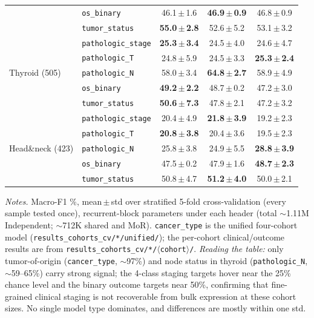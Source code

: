 \documentclass[11pt]{article}
\newcommand{\best}[1]{\textbf{#1}}
\begin{document}
\begin{table}[h]
\begin{tabular}{l l c c c}
 & \texttt{os\_binary}        & 46.1\,$\pm$\,1.6 & \best{46.9\,$\pm$\,0.9} & 46.8\,$\pm$\,0.9 \\
 & \texttt{tumor\_status}     & \best{55.0\,$\pm$\,2.8} & 52.6\,$\pm$\,5.2 & 53.1\,$\pm$\,3.2 \\
\midrule
\multirow{5}{*}{Thyroid (505)}
 & \texttt{pathologic\_stage} & \best{25.3\,$\pm$\,3.4} & 24.5\,$\pm$\,4.0 & 24.6\,$\pm$\,4.7 \\
 & \texttt{pathologic\_T}     & 24.8\,$\pm$\,5.9 & 24.5\,$\pm$\,3.3 & \best{25.3\,$\pm$\,2.4} \\
 & \texttt{pathologic\_N}     & 58.0\,$\pm$\,3.4 & \best{64.8\,$\pm$\,2.7} & 58.9\,$\pm$\,4.9 \\
 & \texttt{os\_binary}        & \best{49.2\,$\pm$\,2.2} & 48.7\,$\pm$\,0.2 & 47.2\,$\pm$\,3.0 \\
 & \texttt{tumor\_status}     & \best{50.6\,$\pm$\,7.3} & 47.8\,$\pm$\,2.1 & 47.2\,$\pm$\,3.2 \\
\midrule
\multirow{5}{*}{Head\&neck (423)}
 & \texttt{pathologic\_stage} & 20.4\,$\pm$\,4.9 & \best{21.8\,$\pm$\,3.9} & 19.2\,$\pm$\,2.3 \\
 & \texttt{pathologic\_T}     & \best{20.8\,$\pm$\,3.8} & 20.4\,$\pm$\,3.6 & 19.5\,$\pm$\,2.3 \\
 & \texttt{pathologic\_N}     & 25.8\,$\pm$\,3.8 & 24.9\,$\pm$\,5.5 & \best{28.8\,$\pm$\,3.9} \\
 & \texttt{os\_binary}        & 47.5\,$\pm$\,0.2 & 47.9\,$\pm$\,1.6 & \best{48.7\,$\pm$\,2.3} \\
 & \texttt{tumor\_status}     & 50.8\,$\pm$\,4.7 & \best{51.2\,$\pm$\,4.0} & 50.0\,$\pm$\,2.1 \\
\bottomrule
\end{tabular}
\end{table}

\vspace{0.3em}
\noindent\footnotesize
\textit{Notes.} Macro-F1 \%, mean\,$\pm$\,std over stratified 5-fold cross-validation
(every sample tested once), recurrent-block parameters under each header (total $\sim$1.11M
Independent; $\sim$712K shared and MoR). \texttt{cancer\_type} is the unified four-cohort model
(\texttt{results\_cohorts\_cv/*/unified/}); the per-cohort clinical/outcome results are from
\texttt{results\_cohorts\_cv/*/$\langle$cohort$\rangle$/}. \emph{Reading the table:} only
tumor-of-origin (\texttt{cancer\_type}, $\sim$97\%) and node status in thyroid
(\texttt{pathologic\_N}, $\sim$59--65\%) carry strong signal; the 4-class staging targets hover
near the 25\% chance level and the binary outcome targets near 50\%, confirming that
fine-grained clinical staging is not recoverable from bulk expression at these cohort sizes.
No single model type dominates, and differences are mostly within one std.
\end{document}
